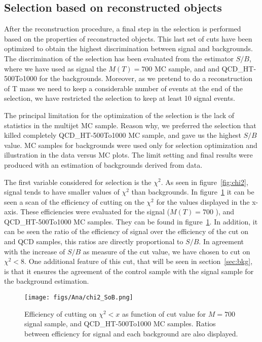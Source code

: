 \subsection{Selection based on reconstructed objects}

After the reconstruction procedure, a final step in the selection is performed based on the properties of reconstructed objects. This last set of cuts have been optimized to obtain the highest discrimination between signal and backgrounds. The discrimination of the selection has been evaluated from the estimator $S/B$, where we have used as signal the $M(T)=700$ \GeVcc MC sample, and \ttbar and QCD\_HT-500To1000 for the backgrounds. Moreover, as we pretend to do a reconstruction of T mass we need to keep a considerable number of events at the end of the selection, we have restricted the selection to keep at least 10 signal events. 

The principal limitation for the optimization of the selection is the lack of statistics in the multijet MC sample. Reason why, we preferred the selection that killed completely QCD\_HT-500To1000 MC sample, and gave us the highest $S/B$ value. MC samples for backgrounds were used only for selection optimization and illustration in the data versus MC plots. The limit setting and final results were produced with an estimation of backgrounds derived from data.  

The first variable considered for selection is the $\chi^{2}$. As seen in figure~\ref{fig:chi2}, signal tends to have smaller values of $\chi^{2}$ than backgrounds. In figure~\ref{fig:chi2cut} it can be seen a scan of the efficiency of cutting on the $\chi^{2}$ for the values displayed in the x-axis. These efficiencies were evaluated for the signal ($M(T)=700$ \GeVcc), \ttbar and QCD\_HT-500To1000 MC samples. They can be found in figure~\ref{fig:chi2cut}. In addition, it can be seen the ratio of the efficiency of signal over the efficiency of the cut on \ttbar and QCD samples, this ratios are directly proportional to $S/B$. In agreement with the increase of $S/B$ as measure of the cut value, we have chosen to cut on $\chi^{2}<8$. One additional feature of this cut, that will be seen in section~\ref{sec:bkg}, is that it ensures the agreement of the control sample with the signal sample for the background estimation. 

\begin{figure}[!Hhtbp]
  \begin{center}
    \texttt{[image: figs/Ana/chi2\_SoB.png]}
    \caption{Efficiency of cutting on $\chi^{2}<x$ as function of cut value for $M=700$ \GeVcc signal sample, \ttbar and QCD\_HT-500To1000 MC samples. Ratios between efficiency for signal and each background are also displayed.}
    \label{fig:chi2cut}
  \end{center}
\end{figure}

